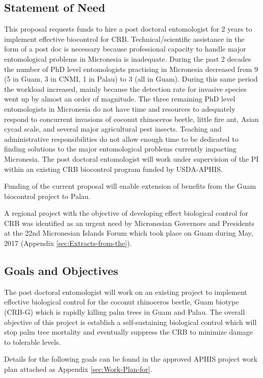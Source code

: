 \documentclass[12pt,letterpaper,english,bibliography=totocnumbered, abstract=on]{scrartcl}
\begin{document}
\subsection{Statement of Need}

This proposal requests funds to hire a post doctoral entomologist
for 2 years to implement effective biocontrol for CRB. Technical/scientific
assistance in the form of a post doc is necessary because professional
capacity to handle major entomological problems in Micronesia is inadequate.
During the past 2 decades the number of PhD level entomologists practising
in Micronesia decreased from 9 (5 in Guam, 3 in CNMI, 1 in Palau)
to 3 (all in Guam). During this same period the workload increased,
mainly because the detection rate for invasive species went up by
almost an order of magnitude. The three remaining PhD level entomologists
in Micronesia do not have time and resources to adequately respond
to concurrent invasions of coconut rhinoceros beetle, little fire
ant, Asian cycad scale, and several major agricultural pest insects.
Teaching and administrative responsibilities do not allow enough time
to be dedicated to finding solutions to the major entomological problems
currently impacting Micronesia. The post doctoral entomologist will
work under supervision of the PI within an existing CRB biocontrol
program funded by USDA-APHIS. 

Funding of the current proposal will enable extension of benefits
from the Guam biocontrol project to Palau.

A regional project with the objective of developing effect biological
control for CRB was identified as an urgent need by Micronesian Governors
and Presidents at the 22nd Micronesian Islands Forum which took place
on Guam during May, 2017 (Appendix \ref{sec:Extracts-from-the}).

\subsection{Goals and Objectives}

The post doctoral entomologist will work on an existing project to
implement effective biological control for the coconut rhinoceros
beetle, Guam biotype (CRB-G) which is rapidly killing palm trees in
Guam and Palau. The overall objective of this project is establish
a self-sustaining biological control which will stop palm tree mortality
and eventually suppress the CRB to minimize damage to tolerable levels. 

Details for the following goals can be found in the approved APHIS
project work plan attached as Appendix \ref{sec:Work-Plan-for}.
\end{document}
